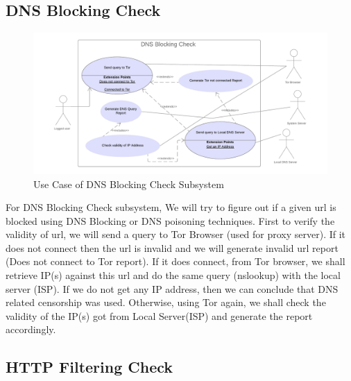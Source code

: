 \documentclass[12pt]{article}
\begin{document}
\subsection{DNS Blocking Check}
\begin{figure}[h]
    \centering
    \includegraphics[width=\textwidth]{ucdns.png}
    \caption{Use Case of DNS Blocking Check Subsystem}
    \label{fig:ucdns}
\end{figure}
For DNS Blocking Check subsystem, We will try to figure out if a given url is blocked using DNS Blocking or DNS poisoning techniques. First to verify the validity of url, we will send a query to Tor Browser (used for proxy server). If it does not connect then the url is invalid and we will generate invalid url report (Does not connect to Tor report). If it does connect, from Tor browser, we shall retrieve IP(s) against this url and do the same query (nslookup) with the local server (ISP). If we do not get any IP address, then we can conclude that DNS related censorship was used. Otherwise, using Tor again, we shall check the validity of the IP(s) got from Local Server(ISP) and generate the report accordingly.

\newpage
\subsection{HTTP Filtering Check}
\end{document}
